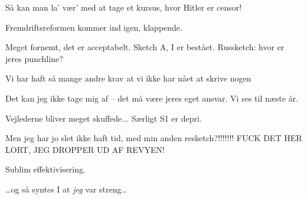 \documentclass[a4paper,11pt]{article}
\begin{document}
\begin{sketch}

 Så kan man la' vær' med at tage et kursus, hvor Hitler er censor!


\scene Fremdriftsreformen kommer ind igen, klappende.

 Meget fornemt, det er acceptabelt. Sketch A, I er bestået. Russketch: hvor er jeres punchline?

 Vi har haft så mange andre krav at vi ikke har nået at skrive nogen

 Det kan jeg ikke tage mig af – det må være jeres eget ansvar. Vi ses til næste år.

\scene Vejlederne bliver meget skuffede... Særligt S1 er depri.

 Men jeg har jo slet ikke haft tid, med min anden resketch?!!!!!!! FUCK DET HER LORT, JEG DROPPER UD AF REVYEN!

 Sublim effektivisering.

 \ldots og så syntes I at \emph{jeg} var streng\ldots


\end{sketch}
\end{document}
